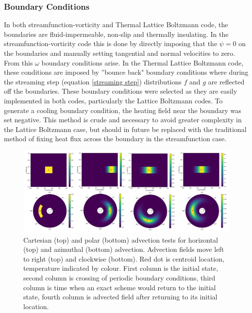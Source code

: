 \documentclass{article}
\begin{document}
\subsubsection*{Boundary Conditions}
\noindent In both streamfunction-vorticity and Thermal Lattice Boltzmann code, the 
boundaries are fluid-impermeable, non-slip and thermally insulating. In the 
streamfunction-vorticity code this is done by directly imposing that the $\psi=0$ on the boundaries and manually setting tangential and normal velocities to zero. 
From this $\omega$ boundary conditions arise. In the Thermal Lattice Boltzmann code, these conditions are imposed by ''bounce back" boundary conditions \cite{mora2020concise}
where during the streaming step (equation \ref{streaming step}) distributions $f$ and $g$ are reflected off the boundaries. These boundary conditions 
were selected as they are easily implemented in both codes, particularly the Lattice Boltzmann codes. To generate a cooling boundary condition, the 
heating field near the boundary was set negative. This method is crude and necessary to avoid greater complexity in the Lattice Boltzmann case, but 
should in future be replaced with the traditional method of fixing heat flux across the boundary in the streamfunction case.


\begin{figure}
	\center
	\includegraphics[scale=1.20]{combinedPeriodic.png}
	\caption{Cartesian (top) and polar (bottom) advection tests for horizontal (top) and azimuthal (bottom) advection. Advection fields move left to right (top) and clockwise (bottom). Red dot is centroid location, temperature indicated by colour. First column is the initial state, second column is crossing of periodic boundary conditions, third column is time when an exact scheme would return to the initial state, fourth column is advected field after returning to its initial location.}
	\label{periodic advection figure}
\end{figure}
\end{document}
